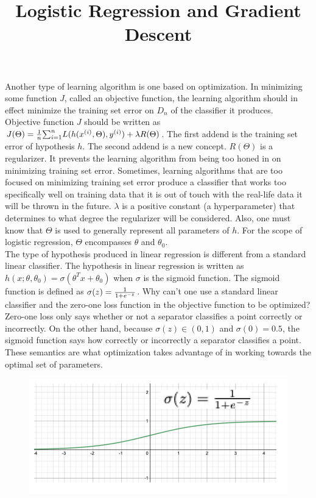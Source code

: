 \documentclass{article}
\title{Logistic Regression and Gradient Descent}
\author{ }
\date{ }
\begin{document}
	\maketitle

    Another type of learning algorithm is one based on optimization. In minimizing some function $J$, called an objective function, the learning algorithm should in effect minimize the training set error on $D_n$ of the classifier it produces. \\

    Objective function $J$ should be written as $J(\Theta) = {1\over{n}}{\sum^n_{i=1}}{L(h(x^{(i)}, \Theta),y^{(i)})+\lambda{R(\Theta)}}$. The first addend is the training set error of hypothesis $h$. The second addend is a new concept. $R(\Theta)$ is a regularizer. It prevents the learning algorithm from being too honed in on minimizing training set error. Sometimes, learning algorithms that are too focused on minimizing training set error produce a classifier that works too specifically well on training data that it is out of touch with the real-life data it will be thrown in the future. $\lambda$ is a positive constant (a hyperparameter) that determines to what degree the regularizer will be considered. Also, one must know that $\Theta$ is used to generally represent all parameters of $h$. For the scope of logistic regression, $\Theta$ encompasses $\theta$ and $\theta_0$. \\

    The type of hypothesis produced in linear regression is different from a standard linear classifier. The hypothesis in linear regression is written as $h(x; \theta, \theta_0)=\sigma(\theta^Tx+\theta_0)$ when $\sigma$ is the sigmoid function. The sigmoid function is defined as $\sigma(z)={{1}\over{1+e^{-z}}}$. Why can't one use a standard linear classifier and the zero-one loss function in the objective function to be optimized? Zero-one loss only says whether or not a separator classifies a point correctly or incorrectly. On the other hand, because $\sigma(z)\in(0,1)$ and $\sigma(0)=0.5$, the sigmoid function says how correctly or incorrectly a separator classifies a point. These semantics are what optimization takes advantage of in working towards the optimal set of parameters.

    \begin{figure}[H]
        \centering
        \includegraphics[width=0.5\linewidth]{Sigmoid Function.png}
    \end{figure}
\end{document}
